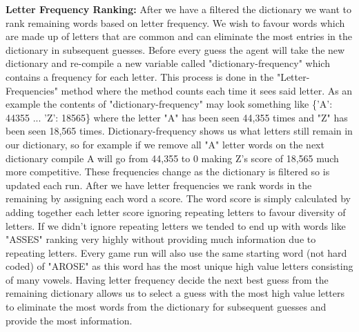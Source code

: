 \documentclass[12pt]{article}
\begin{document}
\item \textbf{Letter Frequency Ranking:} After we have a filtered the dictionary we want to rank remaining words based on letter frequency. We wish to favour words which are made up of letters that are common and can eliminate the most entries in the dictionary in subsequent guesses.  Before every guess the agent will take the new dictionary and re-compile a new variable called "dictionary-frequency" which contains a frequency for each letter. This process is done in the "Letter-Frequencies" method where the method counts each time it sees said letter. As an example the contents of "dictionary-frequency" may look something like \{'A': 44355 ... 'Z': 18565\} where the letter "A" has been seen 44,355 times and "Z" has been seen 18,565 times. Dictionary-frequency shows us what letters still remain in our dictionary, so for example if we remove all "A" letter words on the next dictionary compile A will go from 44,355 to 0 making Z's score of 18,565 much more competitive. These frequencies change as the dictionary is filtered so is updated each run. After we have letter frequencies we rank words in the remaining by assigning each word a score. The word score is simply calculated by adding together each letter score ignoring repeating letters to favour diversity of letters. If we didn't ignore repeating letters we tended to end up with words like "ASSES" ranking very highly without providing much information due to repeating letters. Every game run will also use the same starting word (not hard coded) of "AROSE" as this word has the most unique high value letters consisting of many vowels. Having letter frequency decide the next best guess from the remaining dictionary allows us to select a guess with the most high value letters to eliminate the most words from the dictionary for subsequent guesses and provide the most information.
\end{document}
